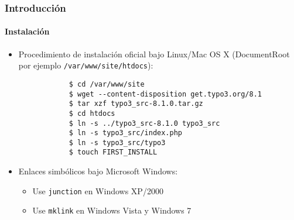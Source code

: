 \begin{frame}[fragile]
	\frametitle{Introducción}
	\framesubtitle{Instalación}

	\begin{itemize}
		\item Procedimiento de instalación oficial bajo Linux/Mac OS X\newline
			(DocumentRoot por ejemplo \texttt{/var/www/site/htdocs}):
		\begin{lstlisting}
			$ cd /var/www/site
			$ wget --content-disposition get.typo3.org/8.1
			$ tar xzf typo3_src-8.1.0.tar.gz
			$ cd htdocs
			$ ln -s ../typo3_src-8.1.0 typo3_src
			$ ln -s typo3_src/index.php
			$ ln -s typo3_src/typo3
			$ touch FIRST_INSTALL
		\end{lstlisting}

		\item Enlaces simbólicos bajo Microsoft Windows:

			\begin{itemize}
				\item Use \texttt{junction} en Windows XP/2000
				\item Use \texttt{mklink} en Windows Vista y Windows 7
			\end{itemize}

	\end{itemize}
\end{frame}

